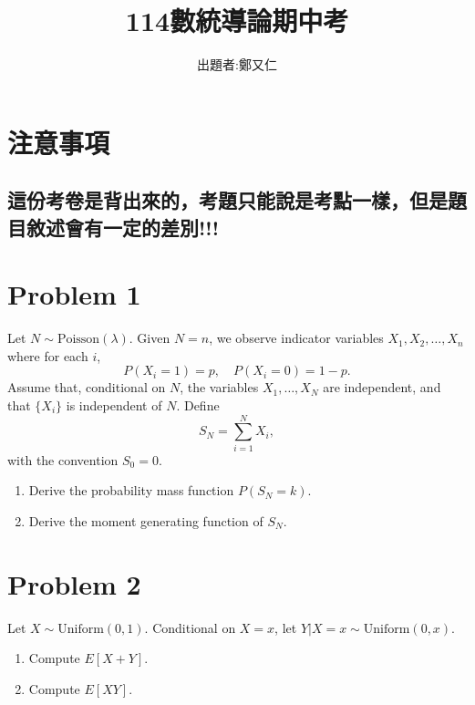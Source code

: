 \documentclass{article}
\title{114數統導論期中考}
\author{出題者:鄭又仁}
\date{}
\begin{document}
\maketitle
\section*{注意事項}
\subsection*{{\color{red}這份考卷是背出來的，考題只能說是考點一樣，但是題目敘述會有一定的差別!!!}}


\section*{Problem 1}
Let $N \sim \text{Poisson}(\lambda)$. Given $N=n$, we observe indicator variables $X_1, X_2, \dots, X_n$ where for each $i$,
\[
P(X_i=1)=p, \quad P(X_i=0)=1-p.
\]
Assume that, conditional on $N$, the variables $X_1, \dots, X_N$ are independent, and that $\{X_i\}$ is independent of $N$. Define
\[
S_N = \sum_{i=1}^{N} X_i,
\]
with the convention $S_0 = 0$.

\begin{enumerate}
    \item Derive the probability mass function $P(S_N = k)$.
    \item Derive the moment generating function of $S_N$.
\end{enumerate}

\section*{Problem 2}
Let $X \sim \text{Uniform}(0,1)$. Conditional on $X=x$, let $Y|X=x \sim \text{Uniform}(0,x)$.

\begin{enumerate}
    \item Compute $E[X+Y]$.
    \item Compute $E[XY]$.
\end{enumerate}
\end{document}
